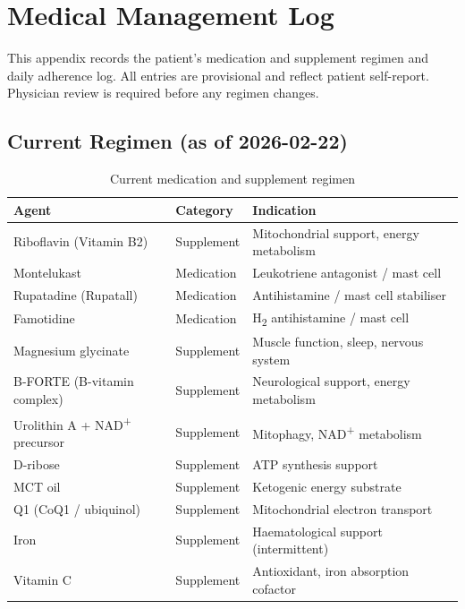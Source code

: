 
\section{Medical Management Log}
\label{sec:appendix-i-a-medical-management}

This appendix records the patient's medication and supplement regimen and daily
adherence log. All entries are provisional and reflect patient self-report.
Physician review is required before any regimen changes.

\subsection{Current Regimen (as of 2026-02-22)}
\label{subsec:current-regimen}

\begin{table}[h]
\centering
\caption{Current medication and supplement regimen}
\label{tab:current-regimen}
\begin{tabular}{lll}
\toprule
Agent & Category & Indication \\
\midrule
Riboflavin (Vitamin B2)      & Supplement  & Mitochondrial support, energy metabolism \\
Montelukast                  & Medication  & Leukotriene antagonist / mast cell \\
Rupatadine (Rupatall)        & Medication  & Antihistamine / mast cell stabiliser \\
Famotidine                   & Medication  & H\textsubscript{2} antihistamine / mast cell \\
Magnesium glycinate          & Supplement  & Muscle function, sleep, nervous system \\
B-FORTE (B-vitamin complex)  & Supplement  & Neurological support, energy metabolism \\
Urolithin A + NAD\textsuperscript{+} precursor & Supplement & Mitophagy, NAD\textsuperscript{+} metabolism \\
D-ribose                     & Supplement  & ATP synthesis support \\
MCT oil                      & Supplement  & Ketogenic energy substrate \\
Q1 (CoQ1 / ubiquinol)        & Supplement  & Mitochondrial electron transport \\
Iron                         & Supplement  & Haematological support (intermittent) \\
Vitamin C                    & Supplement  & Antioxidant, iron absorption cofactor \\
\bottomrule
\end{tabular}
\end{table}

